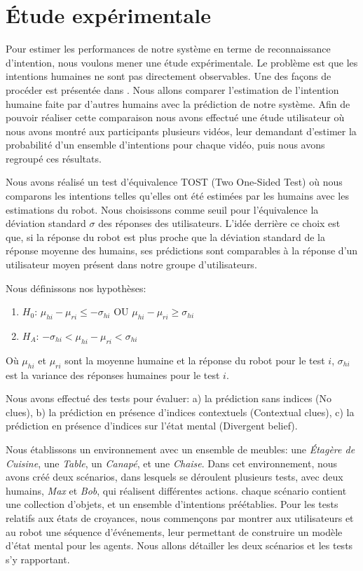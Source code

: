 \documentclass[a4paper,11pt,twoside]{StyleThese}
\begin{document}
\section{Étude expérimentale}
\label{sec:experimentsIntent}
Pour estimer les performances de notre système en terme de reconnaissance d'intention, nous voulons mener une étude expérimentale. Le problème est que les intentions humaines ne sont pas directement observables. Une des façons de procéder est présentée dans \cite{baker2014modeling}. Nous allons comparer l'estimation de l'intention humaine faite par d'autres humains avec la prédiction de notre système. Afin de pouvoir réaliser cette comparaison nous avons effectué une étude utilisateur où nous avons montré aux participants plusieurs vidéos, leur demandant d'estimer la probabilité d'un ensemble d'intentions pour chaque vidéo, puis nous avons regroupé ces résultats.

Nous avons réalisé un test d'équivalence TOST (Two One-Sided Test) où nous comparons les intentions telles qu'elles ont été estimées par les humains avec les estimations du robot. Nous choisissons comme seuil pour l'équivalence la déviation standard $\sigma$ des réponses des utilisateurs. L'idée derrière ce choix est que, si la réponse du robot est plus proche que la déviation standard de la réponse moyenne des humains, ses prédictions sont comparables à la réponse d'un utilisateur moyen présent dans notre groupe d'utilisateurs. 

Nous définissons nos hypothèses:

\begin{enumerate}
\item $H_0$: $\mu_{hi}-\mu_{ri}\leq-\sigma_{hi}$ OU $\mu_{hi}-\mu_{ri}\geq\sigma_{hi}$
\item $H_A$: $-\sigma_{hi}<\mu_{hi}-\mu_{ri}<\sigma_{hi}$
\end{enumerate}

Où $\mu_{hi}$ et $\mu_{ri}$ sont la moyenne humaine et la réponse du robot pour le test $i$, $\sigma_{hi}$ est la variance des réponses humaines pour le test $i$.

Nous avons effectué des tests pour évaluer: a) la prédiction sans indices (No clues), b) la prédiction en présence d'indices contextuels (Contextual clues), c) la prédiction en présence d'indices sur l'état mental (Divergent belief).

Nous établissons un environnement avec un ensemble de meubles: une \textit{Étagère de Cuisine}, une \textit{Table}, un \textit{Canapé}, et une \textit{Chaise}. Dans cet environnement, nous avons créé deux scénarios, dans lesquels se déroulent plusieurs tests, avec deux humains, \textit{Max} et \textit{Bob}, qui réalisent différentes actions. chaque scénario contient une collection d'objets, et un ensemble d'intentions préétablies. Pour les tests relatifs aux états de croyances, nous commençons par montrer aux utilisateurs et au robot une séquence d'événements, leur permettant de construire un modèle d'état mental pour les agents. Nous allons détailler les deux scénarios et les tests s'y rapportant.
\end{document}
